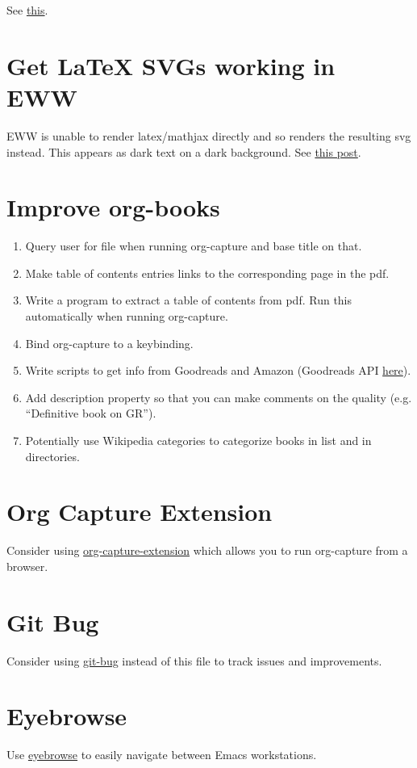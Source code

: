 \documentclass{default}
\begin{document}
See \href{https://emacsnotes.wordpress.com/2018/08/18/why-a-minimal-browser-when-there-is-a-full-featured-one-introducingxwidget-webkit-a-state-of-the-art-browser-for-your-modern-emacs/}{this}.

\section{Get LaTeX SVGs working in EWW}

EWW is unable to render latex/mathjax directly and so renders the resulting svg instead. This
appears as dark text on a dark background. See
\href{https://emacs.stackexchange.com/questions/3622/use-a-different-color-theme-for-eww-buffers}{this
  post}.

\section{Improve org-books}

\begin{enumerate}
\item Query user for file when running org-capture and base title on that.
\item Make table of contents entries links to the corresponding page in the pdf.
\item Write a program to extract a table of contents from pdf. Run this automatically when running
  org-capture.
\item Bind org-capture to a keybinding.
\item Write scripts to get info from Goodreads and Amazon (Goodreads API
  \href{https://www.goodreads.com/api}{here}).
\item Add description property so that you can make comments on the quality (e.g. ``Definitive book
  on GR'').
\item Potentially use Wikipedia categories to categorize books in list and in directories.
\end{enumerate}

\section{Org Capture Extension}

Consider using \href{https://github.com/sprig/org-capture-extension}{org-capture-extension} which
allows you to run org-capture from a browser.

\section{Git Bug}

Consider using \href{https://github.com/MichaelMure/git-bug}{git-bug} instead of this file to track
issues and improvements.

\section{Eyebrowse}

Use \href{https://github.com/wasamasa/eyebrowse}{eyebrowse} to easily navigate between Emacs workstations.
\end{document}
